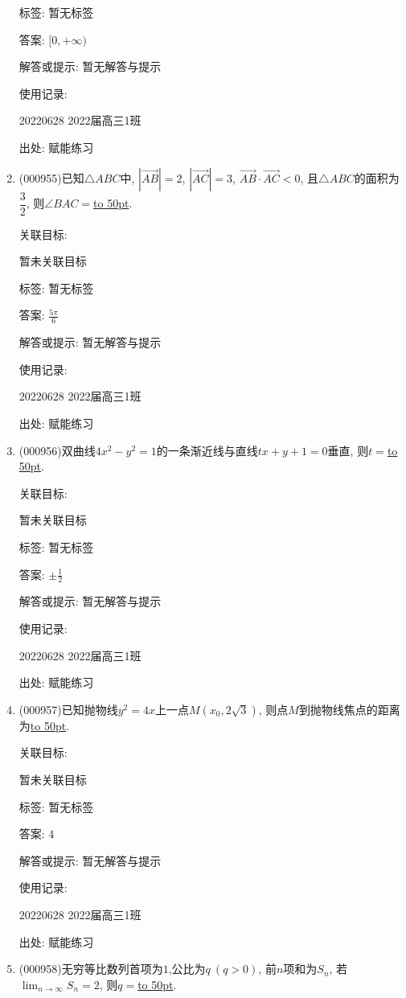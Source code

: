 \documentclass[10pt,a4paper]{article}
\newcommand{\blank}[1]{\underline{\hbox to #1pt{}}}
\begin{document}
\begin{enumerate}[1.]
标签: 暂无标签

答案: $[0,+\infty)$

解答或提示: 暂无解答与提示

使用记录:

20220628	2022届高三1班	


出处: 赋能练习
\item { (000955)}已知$\triangle ABC$中, $|\overrightarrow{AB}|=2 $,  $|\overrightarrow{AC}|=3 $, $\overrightarrow{AB}\cdot \overrightarrow{AC}<0$, 且$\triangle ABC$的面积为$\dfrac32$, 则$\angle BAC=$\blank{50}.


关联目标:

暂未关联目标



标签: 暂无标签

答案: $\frac{5\pi}6$

解答或提示: 暂无解答与提示

使用记录:

20220628	2022届高三1班	


出处: 赋能练习
\item { (000956)}双曲线$4 x^2-y^2=1$的一条渐近线与直线$tx+y+1=0$垂直, 则$t=$\blank{50}.


关联目标:

暂未关联目标



标签: 暂无标签

答案: $\pm \frac 12$

解答或提示: 暂无解答与提示

使用记录:

20220628	2022届高三1班	


出处: 赋能练习
\item { (000957)}已知抛物线$y^2=4x$上一点$M(x_0,2 \sqrt3)$, 则点$M$到抛物线焦点的距离为\blank{50}.


关联目标:

暂未关联目标



标签: 暂无标签

答案: $4$

解答或提示: 暂无解答与提示

使用记录:

20220628	2022届高三1班	


出处: 赋能练习
\item { (000958)}无穷等比数列首项为$1$,公比为$q \ (q>0)$, 前$n$项和为$S_n$, 若$\displaystyle\lim_{n\to\infty}S_n=2$, 则$q=$\blank{50}.



\end{enumerate}
\end{document}
